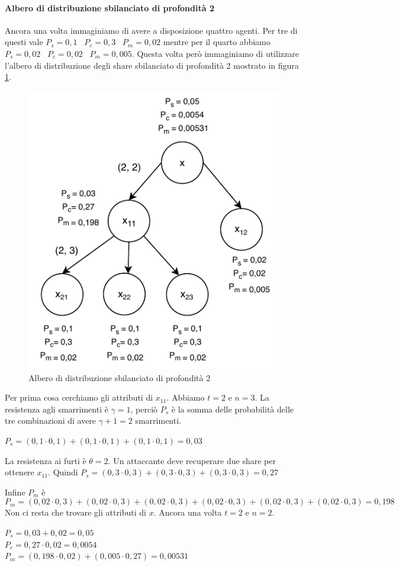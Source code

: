 \paragraph{Albero di distribuzione sbilanciato di profondità 2}
Ancora una volta immaginiamo di avere a disposizione quattro agenti. Per tre di questi
vale
$ P_s = 0,1 $ \,
$ P_c = 0,3 $ \,
$ P_m = 0,02 $
mentre per il quarto abbiamo
$ P_s = 0,02 $ \,
$ P_c = 0,02 $ \,
$ P_m = 0,005 $.
Questa volta però immaginiamo di utilizzare l'albero di distribuzione degli share
sbilanciato di profondità 2
mostrato in figura \ref{fig:robustezza-2-3}.
\begin{figure}[H]
	\centering
	\includegraphics[width=0.6\linewidth]{images/chap_analisi_robustezza/robustezza-2-3.pdf}
	\caption{Albero di distribuzione sbilanciato di profondità 2}
	\label{fig:robustezza-2-3}
\end{figure}
Per prima cosa cerchiamo gli attributi di $ x_{11} $.
Abbiamo $ t = 2 $ e $ n = 3 $. La resistenza agli smarrimenti è $ \gamma = 1 $, perciò $ P_s $
è la somma delle probabilità delle tre combinazioni di avere $ \gamma + 1 = 2 $ smarrimenti.
\begin{tightcenter}
	$ P_s = (0,1 \cdot 0,1) + (0,1 \cdot 0,1) + (0,1 \cdot 0,1) = 0,03 $
\end{tightcenter}

La resistenza ai furti è $ \theta = 2 $. Un attaccante deve recuperare
due share per ottenere $ x_{11} $. Quindi
$ P_s = (0,3 \cdot 0,3) + (0,3 \cdot 0,3) + (0,3 \cdot 0,3) = 0,27 $

Infine $ P_m $ è
$$
	P_m = (0,02 \cdot 0,3) + (0,02 \cdot 0,3) +
	(0,02 \cdot 0,3) + (0,02 \cdot 0,3) +
	(0,02 \cdot 0,3) + (0,02 \cdot 0,3) = 0,198
$$
Non ci resta che trovare gli attributi di $ x $.
Ancora una volta $ t = 2 $ e $ n = 2 $.
\begin{tightcenter}
	$ P_s = 0,03 + 0,02 = 0,05 $      \\
	$ P_c = 0,27 \cdot 0,02 = 0,0054 $\\
	$ P_m = (0,198 \cdot 0,02) + (0,005 \cdot 0,27) = 0,00531 $
\end{tightcenter}



